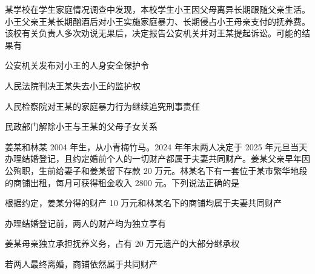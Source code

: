 \documentclass{exam-zh}
\begin{document}
\begin{question}
  某学校在学生家庭情况调查中发现，本校学生小王因父母离异长期跟随父亲生活。小王父亲王某长期酗酒后对小王实施家庭暴力、长期侵占小王母亲支付的抚养费。该校有关负责人多次劝说无果后，决定报告公安机关并对王某提起诉讼。可能的结果有

   公安机关发布对小王的人身安全保护令

   人民法院判决王某失去小王的监护权

   人民检察院对王某的家庭暴力行为继续追究刑事责任

   民政部门解除小王与王某的父母子女关系

  \begin{choices}
  \item {}
  \item {}
  \item {}
  \item {}
  \end{choices}
\end{question}

\begin{question}
  姜某和林某 2004 年生，从小青梅竹马。2024 年年末两人决定于 2025 年元旦当天办理结婚登记，且约定婚前个人的一切财产都属于夫妻共同财产。姜某父亲早年因公殉职，生前给妻子和姜某留下存款 20 万元。林某名下有一套位于某市繁华地段的商铺出租，每月可获得租金收入 2800 元。下列说法正确的是

   根据约定，姜某分得的财产 10 万元和林某名下的商铺均属于夫妻共同财产

   办理结婚登记前，两人的财产均为独立享有

   姜某母亲独立承担抚养义务，占有 20 万元遗产的大部分继承权

   若两人最终离婚，商铺依然属于共同财产

  \begin{choices}
  \item {}
  \item {}
  \item {}
  \item {}
  \end{choices}
\end{question}
\end{document}

